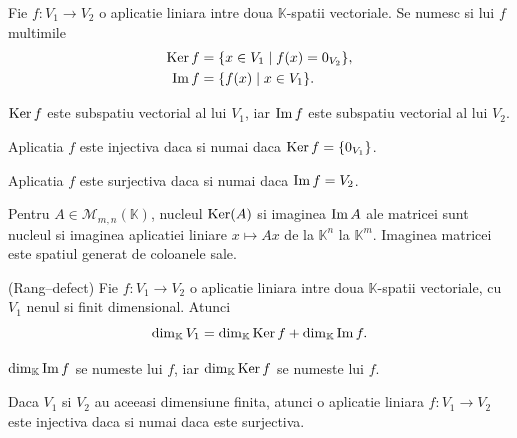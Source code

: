 \documentclass{article}
\begin{document}
\begin{enumerate}
   Fie $f : V_1 \to V_2$ o aplicatie liniara intre doua $\mathbb{K}$-spatii vectoriale. Se numesc  si  lui $f$ multimile
  \begin{align*}
    \operatorname{Ker} f &= \{x \in V_1 \mid f(x) = 0_{V_2}\}, \\
    \operatorname{Im} f &= \{f(x) \mid x \in V_1\}.
  \end{align*}

  \proprietate $\operatorname{Ker} f$ este subspatiu vectorial al lui $V_1$, iar $\operatorname{Im} f$ este subspatiu vectorial al lui $V_2$.

  \proprietate Aplicatia $f$ este injectiva daca si numai daca $\operatorname{Ker} f = \{0_{V_1}\}$.

  \proprietate Aplicatia $f$ este surjectiva daca si numai daca $\operatorname{Im} f = V_2$.

  \observatie Pentru $A \in \mathcal{M}_{m, n}(\mathbb{K})$, nucleul $\operatorname{Ker}(A)$ si imaginea $\operatorname{Im} A$ ale matricei sunt nucleul si imaginea aplicatiei liniare $x \mapsto Ax$ de la $\mathbb{K}^n$ la $\mathbb{K}^m$. Imaginea matricei este spatiul generat de coloanele sale.

  \begin{tcolorbox}
    \teorema (Rang--defect) Fie $f : V_1 \to V_2$ o aplicatie liniara intre doua $\mathbb{K}$-spatii vectoriale, cu $V_1$ nenul si finit dimensional. Atunci
    \[
      \dim_{\mathbb{K}} V_1 = \dim_{\mathbb{K}} \operatorname{Ker} f + \dim_{\mathbb{K}} \operatorname{Im} f.
    \]
  \end{tcolorbox}

  \observatie $\dim_{\mathbb{K}} \operatorname{Im} f$ se numeste  lui $f$, iar $\dim_{\mathbb{K}} \operatorname{Ker} f$ se numeste  lui $f$.

  \corolar Daca $V_1$ si $V_2$ au aceeasi dimensiune finita, atunci o aplicatie liniara $f : V_1 \to V_2$ este injectiva daca si numai daca este surjectiva.

\end{enumerate}
\end{document}

